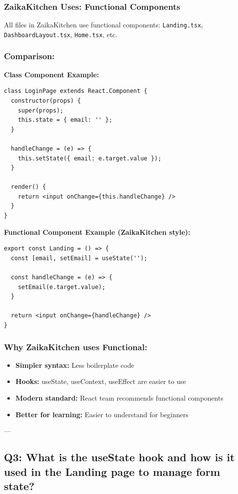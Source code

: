 \documentclass[12pt]{article}
\begin{document}
\subsubsection*{ZaikaKitchen Uses: Functional Components}

All files in ZaikaKitchen use functional components: \texttt{Landing.tsx}, \texttt{DashboardLayout.tsx}, \texttt{Home.tsx}, etc.

\subsubsection*{Comparison:}

\textbf{Class Component Example:}
\begin{lstlisting}
class LoginPage extends React.Component {
  constructor(props) {
    super(props);
    this.state = { email: '' };
  }
  
  handleChange = (e) => {
    this.setState({ email: e.target.value });
  }
  
  render() {
    return <input onChange={this.handleChange} />
  }
}
\end{lstlisting}

\textbf{Functional Component Example (ZaikaKitchen style):}
\begin{lstlisting}
export const Landing = () => {
  const [email, setEmail] = useState('');
  
  const handleChange = (e) => {
    setEmail(e.target.value);
  }
  
  return <input onChange={handleChange} />
}
\end{lstlisting}

\subsubsection*{Why ZaikaKitchen uses Functional:}
\begin{itemize}
    \item \textbf{Simpler syntax:} Less boilerplate code
    \item \textbf{Hooks:} useState, useContext, useEffect are easier to use
    \item \textbf{Modern standard:} React team recommends functional components
    \item \textbf{Better for learning:} Easier to understand for beginners
\end{itemize}

---

\subsection{Q3: What is the useState hook and how is it used in the Landing page to manage form state?}
\end{document}
